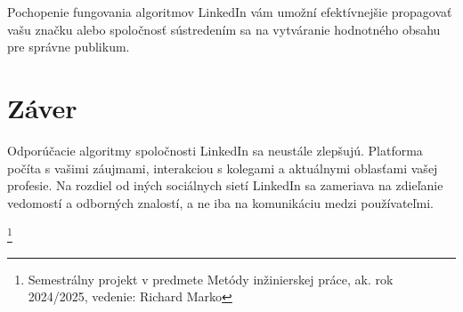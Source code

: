 \documentclass[twoside,slovak,a4paper]{coursepaper}
\begin{document}
Pochopenie fungovania algoritmov LinkedIn vám umožní efektívnejšie propagovať vašu značku alebo spoločnosť sústredením sa na vytváranie hodnotného obsahu pre správne publikum.







 

\section{Záver} \label{zaver}
Odporúčacie algoritmy spoločnosti LinkedIn sa neustále zlepšujú. Platforma počíta s vašimi záujmami, interakciou s kolegami a aktuálnymi oblasťami vašej profesie. Na rozdiel od iných sociálnych sietí LinkedIn sa zameriava na zdieľanie vedomostí a odborných znalostí, a ne iba na komunikáciu medzi používateľmi.

\thanks{Semestrálny projekt v predmete Metódy inžinierskej práce, ak. rok 2024/2025, vedenie: Richard Marko}


 
\end{document}
